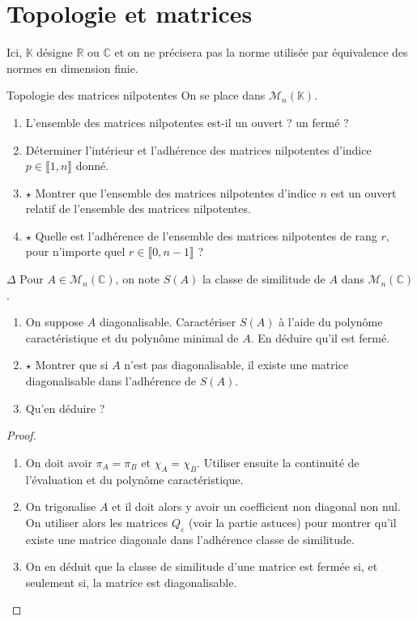 \documentclass[french,a4paper]{article}
\newcommand{\R}{\mathbb{R}}
\newcommand{\C}{\mathbb{C}}
\newcommand{\K}{\mathbb{K}}
\theoremstyle{plain}
\theoremstyle{definition}
\theoremstyle{remark}
\begin{document}
\section{Topologie et matrices}

Ici, $\K$ désigne $\R$ ou $\C$ et on ne précisera pas la norme utilisée par équivalence des normes en dimension finie.

\begin{ex}{Topologie des matrices nilpotentes}
	On se place dans $\mathcal{M}_n(\K)$.
	\begin{enumerate}
		\item L'ensemble des matrices nilpotentes est-il un ouvert ? un fermé ?
		\item Déterminer l'intérieur et l'adhérence des matrices nilpotentes d'indice $p\in\llbracket1,n\rrbracket$ donné.
		\item $\star$ Montrer que l'ensemble des matrices nilpotentes d'indice $n$ est un ouvert relatif de l'ensemble des matrices nilpotentes.
		\item $\star$ Quelle est l'adhérence de l'ensemble des matrices nilpotentes de rang $r$, pour n'importe quel $r\in\llbracket0,n-1\rrbracket$ ?
	\end{enumerate}
\end{ex}

\begin{ex}{$\Delta$}
	Pour $A\in\mathcal{M}_n(\C)$, on note $S(A)$ la classe de similitude de $A$ dans $\mathcal{M}_n(\C)$.
	\begin{enumerate}
		\item On suppose $A$ diagonalisable. Caractériser $S(A)$ à l'aide du polynôme caractéristique et du polynôme minimal de $A$. En déduire qu'il est fermé.
		\item $\star$ Montrer que si $A$ n'est pas diagonalisable, il existe une matrice diagonalisable dans l'adhérence de $S(A)$.
		\item Qu'en déduire ?
	\end{enumerate}
\end{ex}
\begin{proof}
	\begin{enumerate}
		\item On doit avoir $\pi_A=\pi_B$ et $\chi_A=\chi_B$. Utiliser ensuite la continuité de l'évaluation et du polynôme caractéristique.
		\item On trigonalise $A$ et il doit alors y avoir un coefficient non diagonal non nul. On utiliser alors les matrices $Q_\varepsilon$ (voir la partie astuces) pour montrer qu'il existe une matrice diagonale dans l'adhérence classe de similitude.
		\item On en déduit que la classe de similitude d'une matrice est fermée si, et seulement si, la matrice est diagonalisable.
	\end{enumerate}
\end{proof}
\end{document}
